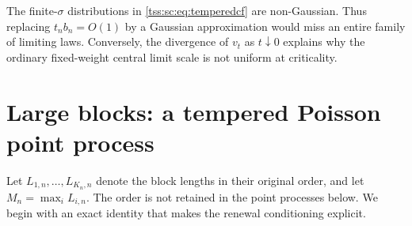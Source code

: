 \documentclass[11pt]{article}
\theoremstyle{remark}\newtheorem{remark}[theorem]{Remark}
\theoremstyle{definition}\newtheorem{definition}[theorem]{Definition}
\begin{document}
The finite-$\sigma$ distributions in \eqref{tss:sc:eq:temperedcf} are non-Gaussian. Thus replacing $t_nb_n=O(1)$ by a Gaussian approximation would miss an entire family of limiting laws. Conversely, the divergence of $v_t$ as $t\downarrow0$ explains why the ordinary fixed-weight central limit scale is not uniform at criticality.

\section{Large blocks: a tempered Poisson point process}
\label{tss:sc:sec:point}

Let $L_{1,n},\ldots,L_{K_n,n}$ denote the block lengths in their original order, and let $M_n=\max_iL_{i,n}$. The order is not retained in the point processes below. We begin with an exact identity that makes the renewal conditioning explicit.
\end{document}
